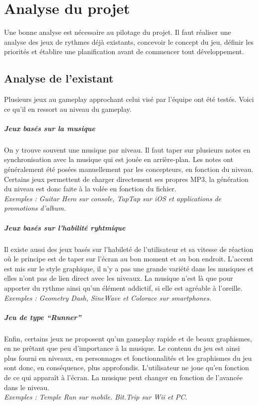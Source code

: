 \chapter{Analyse du projet} %

Une bonne analyse est nécessaire au pilotage du projet. Il faut réaliser une analyse des jeux de rythmes déjà existants, concevoir le concept du jeu, définir les priorités et établire une planification avant de commencer tout développement.

\section{Analyse de l'existant}

Plusieurs jeux au gameplay approchant celui visé par l’équipe ont été testés. Voici ce qu’il en ressort au niveau du gameplay.
\paragraph{Jeux basés sur la musique}
On y trouve souvent une musique par niveau. Il faut taper sur plusieurs notes en synchronisation avec la musique qui est jouée en arrière-plan. Les notes ont généralement été posées manuellement par les concepteurs, en fonction du niveau. Certains jeux permettent de charger directement ses propres MP3, la génération du niveau est donc faite à la volée en fonction du fichier.\\
\textit{Exemples : Guitar Hero sur console, TapTap sur iOS et applications de promotions d’album.}
\paragraph{Jeux basés sur l’habilité ryhtmique}
Il existe aussi des jeux basés sur l’habileté de l’utilisateur et sa vitesse de réaction où le principe est de taper sur l’écran au bon moment et au bon endroit. L'accent est mis sur le style graphique, il n'y a pas une grande variété dans les musiques et elles n'ont pas de lien direct avec les niveaux. La musique n'est là que pour apporter du rythme ainsi qu’un élément addictif, si elle est agréable à l’oreille.\\
\textit{Exemples : Geometry Dash, SineWave et Colorace sur smartphones.}
\paragraph{Jeu de type “Runner”}
Enfin, certains jeux ne proposent qu’un gameplay rapide et de beaux graphismes, en ne prêtant que peu d’importance à la musique. Le contenu du jeu est ainsi plus fourni en niveaux, en personnages et fonctionnalités et les graphismes du jeu sont donc, en conséquence, plus approfondis. L’utilisateur ne joue qu’en fonction de ce qui apparaît à l’écran. La musique peut changer en fonction de l’avancée dans le niveau.\\
\textit{Exemples : Temple Run sur mobile. Bit.Trip sur Wii et PC.}

